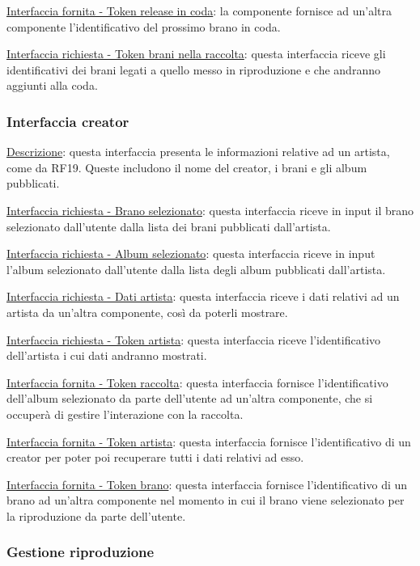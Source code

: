 \documentclass[a4paper,12pt]{article}
\begin{document}
\underline{Interfaccia fornita - Token release in coda}: la componente fornisce ad un’altra componente l’identificativo del prossimo brano in coda.

\underline{Interfaccia richiesta - Token brani nella raccolta}: questa interfaccia riceve gli identificativi dei brani legati a quello messo in riproduzione e che andranno aggiunti alla coda.

\subsubsection{Interfaccia creator}

\underline{Descrizione}: questa interfaccia presenta le informazioni relative ad un artista, come da RF19. Queste includono il nome del creator, i brani e gli album pubblicati.

\underline{Interfaccia richiesta - Brano selezionato}: questa interfaccia riceve in input il brano selezionato dall’utente dalla lista dei brani pubblicati dall’artista.

\underline{Interfaccia richiesta - Album selezionato}: questa interfaccia riceve in input l’album selezionato dall’utente dalla lista degli album pubblicati dall’artista.

\underline{Interfaccia richiesta - Dati artista}: questa interfaccia riceve i dati relativi ad un artista da un’altra componente, così da poterli mostrare.

\underline{Interfaccia richiesta - Token artista}: questa interfaccia riceve l’identificativo dell’artista i cui dati andranno mostrati. 

\underline{Interfaccia fornita - Token raccolta}: questa interfaccia  fornisce l’identificativo dell'album selezionato da parte dell’utente ad un’altra componente, che si occuperà di gestire l’interazione con la raccolta.

\underline{Interfaccia fornita - Token artista}: questa interfaccia  fornisce l’identificativo di un creator per poter poi recuperare tutti i dati relativi ad esso.

\underline{Interfaccia fornita - Token brano}: questa interfaccia fornisce l’identificativo di un brano ad un’altra componente nel momento in cui il brano viene selezionato per la riproduzione da parte dell’utente.

\subsubsection{Gestione riproduzione}
\end{document}
